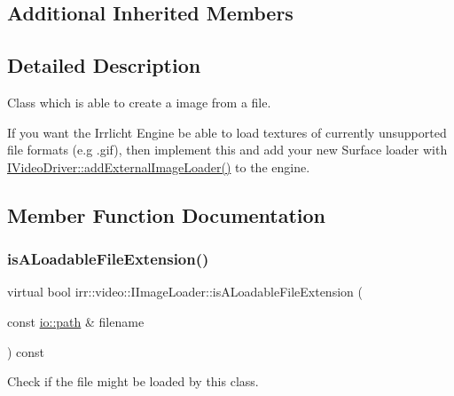 \subsection*{Additional Inherited Members}


\subsection{Detailed Description}
Class which is able to create a image from a file. 

If you want the Irrlicht Engine be able to load textures of currently unsupported file formats (e.\+g .gif), then implement this and add your new Surface loader with \hyperlink{classirr_1_1video_1_1IVideoDriver_a9479ae15f0e26eaaf15c9420ff289b6d}{I\+Video\+Driver\+::add\+External\+Image\+Loader()} to the engine. 

\subsection{Member Function Documentation}
\mbox{\label{classirr_1_1video_1_1IImageLoader_a74f191446424017b8a71fea274bd0f0a}} 
\subsubsection{\texorpdfstring{is\+A\+Loadable\+File\+Extension()}{isALoadableFileExtension()}\hspace{0.1cm}{\footnotesize\ttfamily [1/2]}}
{\footnotesize\ttfamily virtual bool irr\+::video\+::\+I\+Image\+Loader\+::is\+A\+Loadable\+File\+Extension (\begin{DoxyParamCaption}\item[{const \hyperlink{namespaceirr_1_1io_a6468281622ce3a1c46b72e19f32dded5}{io\+::path} \&}]{filename }\end{DoxyParamCaption}) const\hspace{0.3cm}{\ttfamily [pure virtual]}}



Check if the file might be loaded by this class. 

